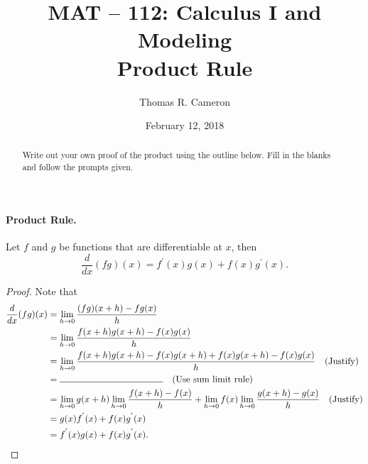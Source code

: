\documentclass{article}
\title{MAT -- 112: Calculus I and Modeling\\
\large{Product Rule}}
\author{Thomas R. Cameron}
\date{February 12, 2018}
\begin{document}
\maketitle

\begin{abstract}
Write out your own proof of the product using the outline below. Fill in the blanks and follow the prompts given. 
\end{abstract}

\paragraph*{Product Rule.} Let $f$ and $g$ be functions that are differentiable at $x$, then
\[
\frac{d}{dx}(fg)(x)=f^{'}(x)g(x)+f(x)g^{'}(x).
\]
\begin{proof}
Note that
\begin{align*}
\frac{d}{dx}(fg)(x)&=\lim_{h\rightarrow 0}\frac{(fg)(x+h)-fg(x)}{h} \\
&=\lim_{h\rightarrow 0}\frac{f(x+h)g(x+h)-f(x)g(x)}{h} \\
&=\lim_{h\rightarrow 0}\frac{f(x+h)g(x+h) -f(x)g(x+h)+f(x)g(x+h)-f(x)g(x)}{h}\quad\text{(Justify)} \\ 
&=\rule{4cm}{0.15mm}\quad\text{(Use sum limit rule)}\\
&=\lim_{h\rightarrow 0}g(x+h)\lim_{h\rightarrow 0}\frac{f(x+h)-f(x)}{h}+\lim_{h\rightarrow 0}f(x)\lim_{h\rightarrow 0}\frac{g(x+h)-g(x)}{h}\quad\text{(Justify)} \\
&=g(x)f^{'}(x)+f(x)g^{'}(x) \\
&=f^{'}(x)g(x)+f(x)g^{'}(x).
\end{align*}
\end{proof}
\end{document}
